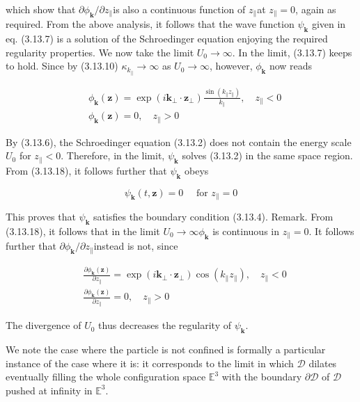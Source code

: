 \documentclass{article}
\begin{document}
which show that $\partial \phi_{\boldsymbol{k}} / \partial z_{\|}$is also a continuous function of $z_{\|}$at $z_{\|}=0$, again as required.
From the above analysis, it follows that the wave function $\psi_{\boldsymbol{k}}$ given in eq. (3.13.7) is a solution of the Schroedinger equation enjoying the required regularity properties. We now take the limit $U_{0} \rightarrow \infty$. In the limit, (3.13.7) keeps to hold. Since by (3.13.10) $\kappa_{k_{\|}} \rightarrow \infty$ as $U_{0} \rightarrow \infty$, however, $\phi_{\boldsymbol{k}}$ now reads
 
\begin{align*}
& \phi_{\boldsymbol{k}}(\boldsymbol{z})=\exp \left(i \boldsymbol{k}_{\perp} \cdot \boldsymbol{z}_{\perp}\right) \frac{\sin \left(k_{\|} z_{\|}\right)}{k_{\|}}, \quad z_{\|}<0  \tag{3.13.18}\\
& \phi_{\boldsymbol{k}}(\boldsymbol{z})=0, \quad z_{\|}>0
\end{align*}
 

By (3.13.6), the Schroedinger equation (3.13.2) does not contain the energy scale $U_{0}$ for $z_{\|}<0$. Therefore, in the limit, $\psi_{\boldsymbol{k}}$ solves (3.13.2) in the same space region. From (3.13.18), it follows further that $\psi_{\boldsymbol{k}}$ obeys
 
\begin{equation*}
\psi_{\boldsymbol{k}}(t, \boldsymbol{z})=0 \quad \text { for } z_{\|}=0 \tag{3.13.19}
\end{equation*}
 

This proves that $\psi_{\boldsymbol{k}}$ satisfies the boundary condition (3.13.4).
Remark. From (3.13.18), it follows that in the limit $U_{0} \rightarrow \infty \phi_{\boldsymbol{k}}$ is continuous in $z_{\|}=0$. It follows further that $\partial \phi_{\boldsymbol{k}} / \partial z_{\|}$instead is not, since
 
\begin{align*}
& \frac{\partial \phi_{\boldsymbol{k}}(\boldsymbol{z})}{\partial z_{\|}}=\exp \left(i \boldsymbol{k}_{\perp} \cdot \boldsymbol{z}_{\perp}\right) \cos \left(k_{\|} z_{\|}\right), \quad z_{\|}<0  \tag{3.13.20}\\
& \frac{\partial \phi_{\boldsymbol{k}}(\boldsymbol{z})}{\partial z_{\|}}=0, \quad z_{\|}>0
\end{align*}
 

The divergence of $U_{0}$ thus decreases the regularity of $\psi_{\boldsymbol{k}}$.

We note the case where the particle is not confined is formally a particular instance of the case where it is: it corresponds to the limit in which $\mathcal{D}$ dilates eventually filling the whole configuration space $\mathbb{E}^{3}$ with the boundary $\partial \mathcal{D}$ of $\mathcal{D}$ pushed at infinity in $\mathbb{E}^{3}$.
\end{document}
